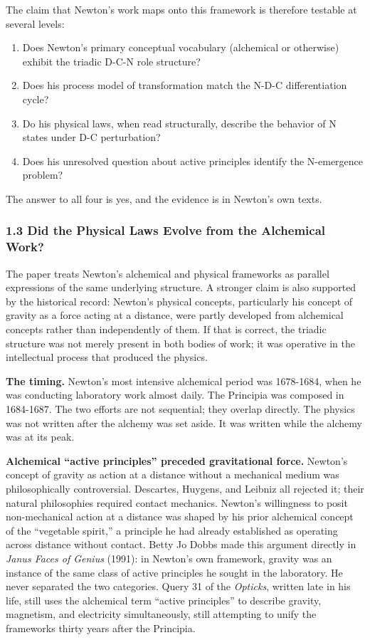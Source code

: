 \documentclass[
  11pt,
  letterpaper,
]{article}
\providecommand{\tightlist}{%
  \setlength{\itemsep}{0pt}\setlength{\parskip}{0pt}}
\begin{document}
The claim that Newton's work maps onto this framework is therefore
testable at several levels:

\begin{enumerate}
\def\labelenumi{\arabic{enumi}.}
\tightlist
\item
  Does Newton's primary conceptual vocabulary (alchemical or otherwise)
  exhibit the triadic D-C-N role structure?
\item
  Does his process model of transformation match the N-D-C
  differentiation cycle?
\item
  Do his physical laws, when read structurally, describe the behavior of
  N states under D-C perturbation?
\item
  Does his unresolved question about active principles identify the
  N-emergence problem?
\end{enumerate}

The answer to all four is yes, and the evidence is in Newton's own
texts.

\subsubsection{1.3 Did the Physical Laws Evolve from the Alchemical
Work?}\label{did-the-physical-laws-evolve-from-the-alchemical-work}

The paper treats Newton's alchemical and physical frameworks as parallel
expressions of the same underlying structure. A stronger claim is also
supported by the historical record: Newton's physical concepts,
particularly his concept of gravity as a force acting at a distance,
were partly developed from alchemical concepts rather than independently
of them. If that is correct, the triadic structure was not merely
present in both bodies of work; it was operative in the intellectual
process that produced the physics.

\textbf{The timing.} Newton's most intensive alchemical period was
1678-1684, when he was conducting laboratory work almost daily. The
Principia was composed in 1684-1687. The two efforts are not sequential;
they overlap directly. The physics was not written after the alchemy was
set aside. It was written while the alchemy was at its peak.

\textbf{Alchemical ``active principles'' preceded gravitational force.}
Newton's concept of gravity as action at a distance without a mechanical
medium was philosophically controversial. Descartes, Huygens, and
Leibniz all rejected it; their natural philosophies required contact
mechanics. Newton's willingness to posit non-mechanical action at a
distance was shaped by his prior alchemical concept of the ``vegetable
spirit,'' a principle he had already established as operating across
distance without contact. Betty Jo Dobbs made this argument directly in
\emph{Janus Faces of Genius} (1991): in Newton's own framework, gravity
was an instance of the same class of active principles he sought in the
laboratory. He never separated the two categories. Query 31 of the
\emph{Opticks}, written late in his life, still uses the alchemical term
``active principles'' to describe gravity, magnetism, and electricity
simultaneously, still attempting to unify the frameworks thirty years
after the Principia.
\end{document}
